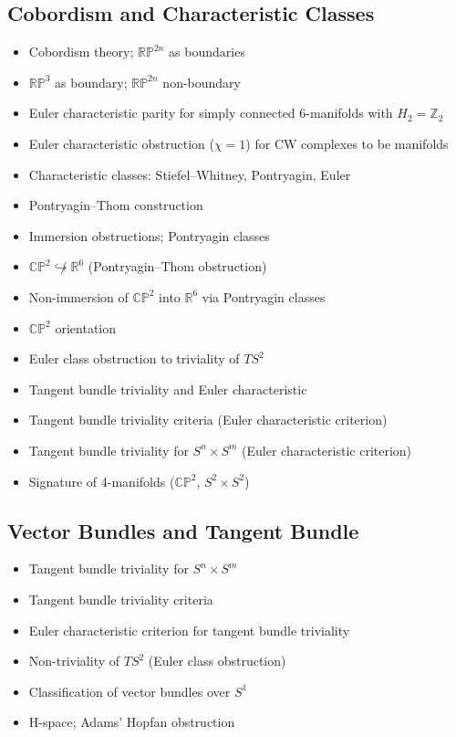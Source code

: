 \documentclass{amsart}
\begin{document}
\subsection{Cobordism and Characteristic Classes}
\begin{itemize}
    \item Cobordism theory; $\mathbb{RP}^{2n}$ as boundaries
    \item $\mathbb{RP}^3$ as boundary; $\mathbb{RP}^{2n}$ non-boundary
    \item Euler characteristic parity for simply connected 6-manifolds with $H_2 = \mathbb{Z}_2$
    \item Euler characteristic obstruction ($\chi = 1$) for CW complexes to be manifolds
    \item Characteristic classes: Stiefel--Whitney, Pontryagin, Euler
    \item Pontryagin--Thom construction
    \item Immersion obstructions; Pontryagin classes
    \item $\mathbb{CP}^2 \not\hookrightarrow \mathbb{R}^6$ (Pontryagin--Thom obstruction)
    \item Non-immersion of $\mathbb{CP}^2$ into $\mathbb{R}^6$ via Pontryagin classes
    \item $\mathbb{CP}^2$ orientation
    \item Euler class obstruction to triviality of $TS^2$
    \item Tangent bundle triviality and Euler characteristic
    \item Tangent bundle triviality criteria (Euler characteristic criterion)
    \item Tangent bundle triviality for $S^n \times S^m$ (Euler characteristic criterion)
    \item Signature of 4-manifolds ($\mathbb{CP}^2$, $S^2 \times S^2$)
\end{itemize}

\subsection{Vector Bundles and Tangent Bundle}
\begin{itemize}
    \item Tangent bundle triviality for $S^n \times S^m$
    \item Tangent bundle triviality criteria
    \item Euler characteristic criterion for tangent bundle triviality
    \item Non-triviality of $TS^2$ (Euler class obstruction)
    \item Classification of vector bundles over $S^1$
    \item H-space; Adams' Hopfan obstruction
\end{itemize}
\end{document}
